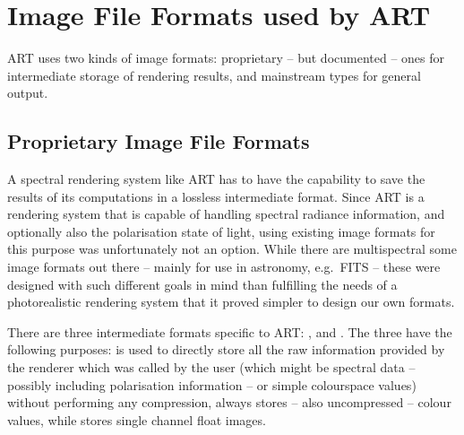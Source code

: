 
\chapter{Image File Formats used by ART}
ART uses two kinds of image formats: proprietary -- but documented -- ones for
intermediate storage of rendering results, and mainstream types for
general output.
\section{Proprietary Image File Formats}
\label{sect:propformats}
A spectral rendering system like ART has to have the capability to save the results of its
computations in a lossless intermediate format. Since ART is a rendering system that is
capable of handling spectral radiance information, and optionally also the polarisation
state of light, using existing image formats for this purpose
was unfortunately not an option. While there are multispectral some image formats out there -- mainly for use in astronomy, e.g.\ FITS -- these were designed with such different goals in mind than
fulfilling the needs of a photorealistic rendering system that it proved simpler
to design our own formats.

There are three intermediate formats specific to ART: , 
and . The three have the following purposes:  is used to
directly store all the raw information provided by the renderer which was called
by the user (which might be spectral data -- possibly including polarisation
information -- or simple colourspace values) without performing any compression,  always stores -- also uncompressed -- 
colour values, while  stores single channel float images.

